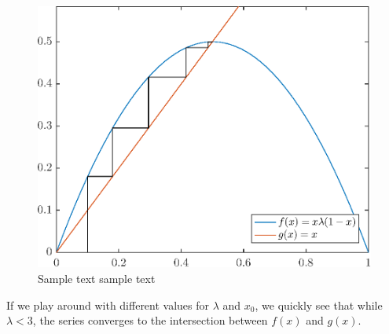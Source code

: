 \documentclass[12pt,oneside,a4paper]{article}
\numberwithin{equation}{section}
\begin{document}
{{{{\begin{figure}
	\centering
	\includegraphics[width=0.65\linewidth]{cobweb_x1_l20_iter50}
	\caption{Sample text sample text}
	\label{fig:cobwebx1l20iter50}
\end{figure}
If we play around with different values for $\lambda$ and 
$x_0$, we quickly see that while $\lambda<3$, the series converges to the 
intersection between $f(x)$ and $g(x)$.
\begin{figure}[h]
	\centering
	\caption{Independence of initial conditions in the cobweb diagram --- $x_0$ has no effect on the value $x_n$ converges to}
	\label{cobweb}
	\begin{subfigure}{0.45\textwidth}

\end{subfigure}
\end{figure}}}}}
\end{document}
